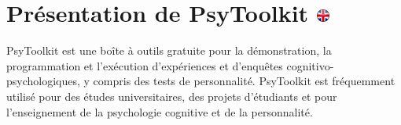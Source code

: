 \documentclass[
]{book}
\begin{document}
\hypertarget{pruxe9sentation-de-psytoolkit}{%
\chapter[Présentation de PsyToolkit ]{\texorpdfstring{Présentation de PsyToolkit \href{https://www.psytoolkit.org/\#_about_psytoolkit}{\protect\includegraphics{img/ukflag.png}}}{Présentation de PsyToolkit }}\label{pruxe9sentation-de-psytoolkit}}

PsyToolkit est une boîte à outils gratuite pour la démonstration, la programmation et l'exécution d'expériences et d'enquêtes cognitivo-psychologiques, y compris des tests de personnalité. PsyToolkit est fréquemment utilisé pour des études universitaires, des projets d'étudiants et pour l'enseignement de la psychologie cognitive et de la personnalité.
\end{document}
